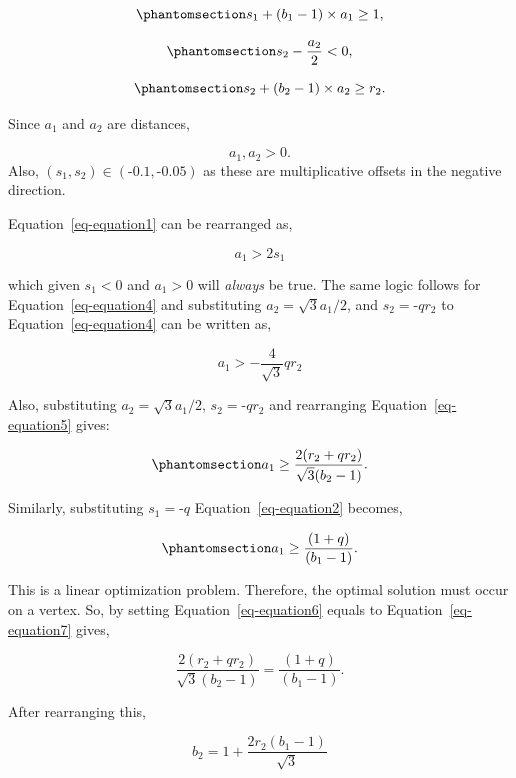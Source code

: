 \documentclass[
  11pt,
  a4paper,
]{report}
\begin{document}
\begin{equation}\phantomsection\label{eq-equation2}{
s_1 + (b_1 - 1) \times a_1 \geq 1,
}\end{equation}

\begin{equation}\phantomsection\label{eq-equation4}{
s_2 - \frac{a_2}{2} < 0,
}\end{equation}

\begin{equation}\phantomsection\label{eq-equation5}{
s_2 + (b_2 - 1) \times a_2 \geq r_2.
}\end{equation}

Since \(a_1\) and \(a_2\) are distances,

\[
a_1, a_2 > 0.
\] Also, \((s_1, s_2) \in (\text{-}0.1, \text{-}0.05)\) as these are
multiplicative offsets in the negative direction.

Equation~\ref{eq-equation1} can be rearranged as,

\[
a_1 > 2s_1
\]

which given \(s_1 < 0\) and \(a_1 > 0\) will \emph{always} be true. The
same logic follows for Equation~\ref{eq-equation4} and substituting
\(a_2 = \sqrt{3}a_1/{2}\), and \(s_2 = \text{-}qr_2\) to
Equation~\ref{eq-equation4} can be written as,

\[
a_1 > -\frac{4}{\sqrt{3}}qr_2
\]

Also, substituting \(a_2 = \sqrt{3}a_1/{2}\), \(s_2 = \text{-}qr_2\) and
rearranging Equation~\ref{eq-equation5} gives:

\begin{equation}\phantomsection\label{eq-equation6}{
a_1 \geq \frac{2(r_2 + qr_2)}{\sqrt{3}(b_2 - 1)}.
}\end{equation}

Similarly, substituting \(s_1 = \text{-}q\) Equation~\ref{eq-equation2}
becomes,

\begin{equation}\phantomsection\label{eq-equation7}{
a_1 \geq \frac{(1 + q)}{(b_1 - 1)}.
}\end{equation}

This is a linear optimization problem. Therefore, the optimal solution
must occur on a vertex. So, by setting Equation~\ref{eq-equation6}
equals to Equation~\ref{eq-equation7} gives,

\[
\frac{2(r_2 + qr_2)}{\sqrt{3}(b_2 - 1)} = \frac{(1 + q)}{(b_1 - 1)}.
\]

After rearranging this,

\[
b_2 = 1 + \frac{2r_2(b_1 - 1)}{\sqrt{3}}
\]
\end{document}
